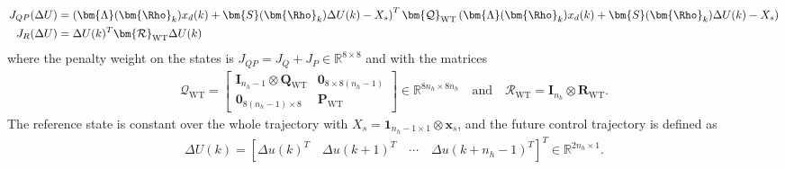 \begin{align*}
    J_{QP}(\Delta U) &= \left(\bm{\Lambda}(\bm{\Rho}_k)x_d(k) + \bm{S}(\bm{\Rho}_k) \Delta U(k)  
    - X_{s}\right)^T \bm{\mathcal{Q}}_{\text{WT}}  \left(\bm{\Lambda}(\bm{\Rho}_k)x_d(k) + \bm{S}(\bm{\Rho}_k) \Delta U(k) - X_{s}\right)\\
    J_R(\Delta U) &= \Delta U(k)^T \bm{\mathcal{R}}_{\text{WT}} \Delta U(k)
\end{align*}
where the penalty weight on the states is $J_{QP} = J_Q + J_P  \in \mathbb{R}^{8 \times 8}$ and with the matrices
\begin{align*}
    \bm{\mathcal{Q}}_{\text{WT}} =\begin{bmatrix} \bm{I}_{n_h -1} \otimes \bm{Q}_{\text{WT}} & \bm{0}_{8\times8(n_h-1)} \\ \bm{0}_{8(n_h-1)\times8}  & \bm{P}_{\text{WT}}\end{bmatrix} \in \mathbb{R}^{8n_h \times 8n_h}\quad\text{and}\quad   \bm{\mathcal{R}}_{\text{WT}} = \bm{I}_{n_h} \otimes \bm{R}_{\text{WT}}.
\end{align*}
The reference state is constant over the whole trajectory with $X_s = \bm{1}_{n_h-1 \times 1 }\otimes \bm{x}_s$, and the future control trajectory is defined as
\begin{align*}
    \Delta U(k) = \left[\Delta u(k)^T \quad \Delta u(k+1)^T \quad   \cdots  \quad   \Delta u(k+ n_h -1)^T \right]^T \in \mathbb{R}^{2n_h \times 1}.
\end{align*}

